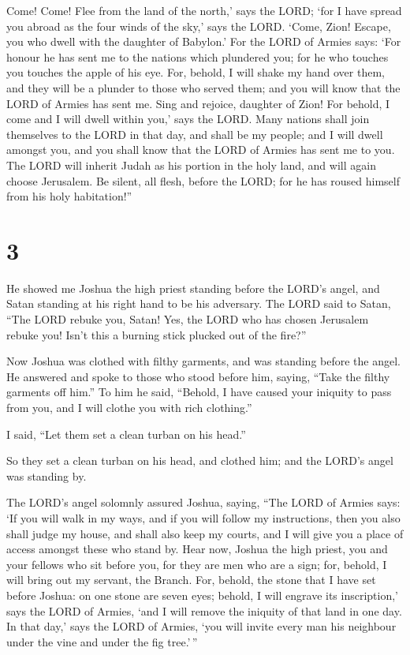  Come! Come! Flee from the land of the north,' says the
LORD; `for I have spread you abroad as the four winds of the sky,' says
the LORD.  `Come, Zion! Escape, you who dwell with the
daughter of Babylon.'  For the LORD of Armies says: `For
honour he has sent me to the nations which plundered you; for he who
touches you touches the apple of his eye.  For, behold, I
will shake my hand over them, and they will be a plunder to those who
served them; and you will know that the LORD of Armies has sent me.
 Sing and rejoice, daughter of Zion! For behold, I come
and I will dwell within you,' says the LORD.  Many
nations shall join themselves to the LORD in that day, and shall be my
people; and I will dwell amongst you, and you shall know that the LORD
of Armies has sent me to you.  The LORD will inherit
Judah as his portion in the holy land, and will again choose Jerusalem.
 Be silent, all flesh, before the LORD; for he has roused
himself from his holy habitation!''

\hypertarget{section-2}{%
\section{3}\label{section-2}}

 He showed me Joshua the high priest standing before the
LORD's angel, and Satan standing at his right hand to be his adversary.
 The LORD said to Satan, ``The LORD rebuke you, Satan!
Yes, the LORD who has chosen Jerusalem rebuke you! Isn't this a burning
stick plucked out of the fire?''

 Now Joshua was clothed with filthy garments, and was
standing before the angel.  He answered and spoke to those
who stood before him, saying, ``Take the filthy garments off him.'' To
him he said, ``Behold, I have caused your iniquity to pass from you, and
I will clothe you with rich clothing.''

 I said, ``Let them set a clean turban on his head.''

So they set a clean turban on his head, and clothed him; and the LORD's
angel was standing by.

 The LORD's angel solomnly assured Joshua, saying,
 ``The LORD of Armies says: `If you will walk in my ways,
and if you will follow my instructions, then you also shall judge my
house, and shall also keep my courts, and I will give you a place of
access amongst these who stand by.  Hear now, Joshua the
high priest, you and your fellows who sit before you, for they are men
who are a sign; for, behold, I will bring out my servant, the Branch.
 For, behold, the stone that I have set before Joshua: on
one stone are seven eyes; behold, I will engrave its inscription,' says
the LORD of Armies, `and I will remove the iniquity of that land in one
day.  In that day,' says the LORD of Armies, `you will
invite every man his neighbour under the vine and under the fig
tree.'\,''

